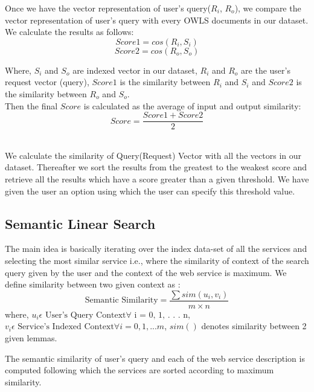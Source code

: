 \documentclass[12pt, oneside]{book}
\begin{document}
Once we have the vector representation of user's query($R_{i}$, $R_{o}$), we compare the vector representation of user's query with every OWLS documents in our dataset. We calculate the results as follows:
\vspace{2pt}
\begin{equation}
 Score1 = cos(R_{i}, S_{i})
\end{equation}
\begin{equation}
 Score2 = cos(R_{o}, S_{o})
\end{equation}
\vspace{2pt}
\par
Where, $S_{i}$ and $S_{o}$ are indexed vector in our dataset, $R_{i}$ and $R_{o}$ are the user's request vector (query), $Score1$ is the similarity between $R_{i}$ and $S_{i}$ and $Score2$ is the similarity between $R_{o}$ and $S_{o}$. \\
Then the final $Score$ is calculated as the average of input and output similarity: \\
\begin{equation}
 Score = \frac{Score1 + Score 2}{2}
\end{equation}
\\ \par
We calculate the similarity of Query(Request) Vector with all the vectors in our dataset. Thereafter we sort the results from the greatest to the weakest score and retrieve all the results which have a score greater than a given threshold. We have given the user an option using which the user can specify this threshold value.

\subsection{Semantic Linear Search}
The main idea is basically iterating over the index data-set of all the services and selecting the most similar service i.e., where the similarity of context of the search query given by the user and the context of the web service is maximum. We define similarity between two given context as :
\begin{equation}
  \text{Semantic Similarity} = \frac{\sum sim(u_{i}, v_{i})}{m \times n}
\end{equation}
where, $u_{i} \epsilon \text{ User's Query Context} \forall \text{ i = 0, 1, . . . n}$, $v_{i} \epsilon \text{ Service's Indexed Context} \forall i = 0, 1, . . . m $, $sim()$ denotes similarity between 2 given lemmas. \\ \par
The semantic similarity of user's query and each of the web service description is computed following which the services are sorted according to maximum similarity.
\end{document}
